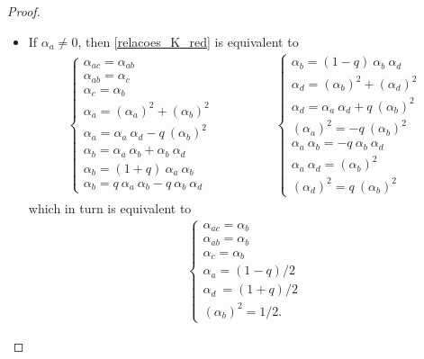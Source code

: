 \documentclass[reqno]{amsart}
\theoremstyle{definition}
\numberwithin{equation}{section}\theoremstyle{plain}
\theoremstyle{definition}
\def \K {\mathcal{K}}
\begin{document}
\begin{proof}
\begin{itemize}
\begin{align*}
\begin{array}{lll}
\end{array} 
\right.
\end{align*}
which is obviously equivalent to
\begin{align*}
\left\{
\begin{array}{lll}
\alpha_{ac} = \alpha_{ab} \\
\alpha_{b} = 0 \\
\alpha_{c} = 0 \\
\alpha_{d} = 0.
\end{array} 
\right.
\end{align*}
Hence, in this case, for any $\alpha \in \Bbbk$, we have the partial action $\lambda_\alpha: \K \to \Bbbk$ as defined in \eqref{lda_alpha}.

\item If $\alpha_a \neq 0$, then \eqref{relacoes_K_red} is equivalent to
\begin{align*}
\left\{
\begin{array}{lll}
\alpha_{ac} = \alpha_{ab} \\
\alpha_{ab} = \alpha_{c} \\
\alpha_{c} = \alpha_{b} \\
\alpha_{a} = (\alpha_{a})^2 + (\alpha_{b})^2 \\
\alpha_{a} = \alpha_{a} \ \alpha_d - q \ (\alpha_{b})^2 \\
\alpha_{b} = \alpha_{a} \ \alpha_b + \alpha_b \ \alpha_{d} \\
\alpha_{b} = (1+q) \ \alpha_{a} \ \alpha_{b} \\
\alpha_{b} = q \ \alpha_{a} \ \alpha_{b} - q \ \alpha_{b} \ \alpha_{d} 
\end{array} 
\right.
& \qquad \qquad 
\left\{
\begin{array}{lll}
\alpha_{b} = (1-q) \ \alpha_{b} \ \alpha_{d} \\
\alpha_{d} = (\alpha_{b})^2 + (\alpha_{d})^2 \\
\alpha_d = \alpha_a \ \alpha_d + q \ (\alpha_b)^2 \\
(\alpha_{a})^2 = - q \ (\alpha_{b})^2 \\
\alpha_{a} \ \alpha_{b} = - q \ \alpha_{b} \ \alpha_{d} \\
\alpha_{a} \ \alpha_{d} = (\alpha_{b})^2\\
(\alpha_{d})^2 = q \ (\alpha_{b})^2
\end{array} 
\right.
\end{align*}
which in turn is equivalent to
\begin{align*}
\left\{
\begin{array}{lll}
\alpha_{ac} = \alpha_{b} \\
\alpha_{ab} = \alpha_{b} \\
\alpha_{c} = \alpha_{b} \\
\alpha_a = (1-q)/2 \\
\alpha_{d} \  = (1+q)/2 \\
(\alpha_{b})^2 = 1/2.
\end{array} 
\right.
\end{align*}


\end{itemize}
\end{proof}
\end{document}

